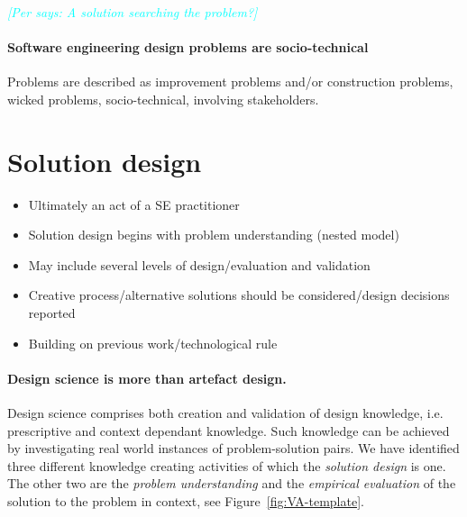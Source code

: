 \documentclass[graybox]{svmult}
\newcommand{\per}[1]{\textcolor{cyan}{{\it [Per says: #1]}}}
\newcommand{\per}[1]{}
\begin{document}
\per{A solution searching the problem?}

\paragraph{Software engineering design problems are socio-technical}
Problems are described as improvement problems and/or construction problems, wicked problems, socio-technical, involving stakeholders. 



\section{Solution design}

\begin{itemize}
\item Ultimately an act of a SE practitioner
\item Solution design begins with problem understanding (nested model)
\item May include several levels of design/evaluation and validation 
\item Creative process/alternative solutions should be considered/design decisions reported
\item Building on previous work/technological rule	
\end{itemize}



\paragraph{Design science is more than artefact design.}

Design science comprises both creation and validation of design knowledge, i.e. prescriptive and context dependant knowledge. Such knowledge can be achieved by investigating real world instances of problem-solution pairs. We have identified three different knowledge creating activities of which the \emph{solution design} is one. The other two are the \emph{problem understanding} and the \emph{empirical evaluation} of the solution to the problem in context, see Figure~\ref{fig:VA-template}.
\end{document}

